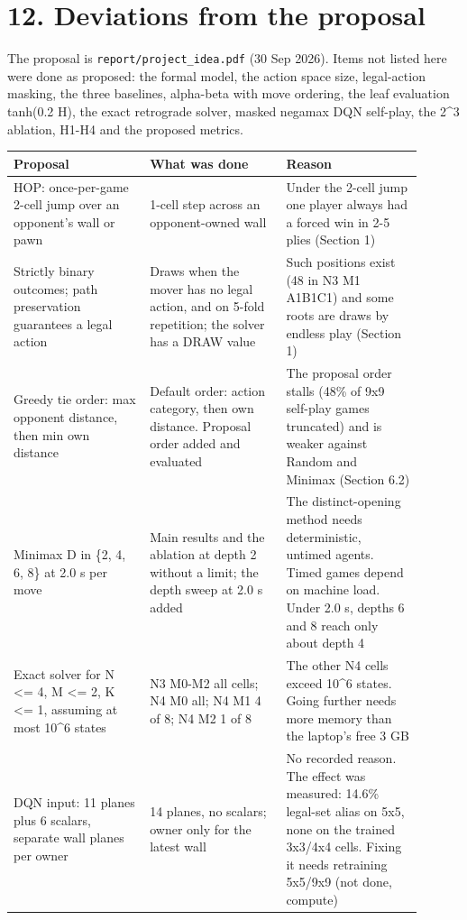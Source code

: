 \documentclass[11pt]{article}
\begin{document}
\section{12. Deviations from the proposal}

The proposal is \texttt{report/project\_idea.pdf} (30 Sep 2026). Items not listed here were done as
proposed: the formal model, the action space size, legal-action masking, the three baselines,
alpha-beta with move ordering, the leaf evaluation tanh(0.2 H), the exact retrograde solver,
masked negamax DQN self-play, the 2\textasciicircum{}3 ablation, H1-H4 and the proposed metrics.

\begin{center}\scriptsize
\begin{longtable}{p{0.30\linewidth}p{0.30\linewidth}p{0.30\linewidth}}
\toprule
Proposal & What was done & Reason \\
\midrule
HOP: once-per-game 2-cell jump over an opponent's wall or pawn & 1-cell step across an opponent-owned wall & Under the 2-cell jump one player always had a forced win in 2-5 plies (Section 1) \\
Strictly binary outcomes; path preservation guarantees a legal action & Draws when the mover has no legal action, and on 5-fold repetition; the solver has a DRAW value & Such positions exist (48 in N3 M1 A1B1C1) and some roots are draws by endless play (Section 1) \\
Greedy tie order: max opponent distance, then min own distance & Default order: action category, then own distance. Proposal order added and evaluated & The proposal order stalls (48\% of 9x9 self-play games truncated) and is weaker against Random and Minimax (Section 6.2) \\
Minimax D in \{2, 4, 6, 8\} at 2.0 s per move & Main results and the ablation at depth 2 without a limit; the depth sweep at 2.0 s added & The distinct-opening method needs deterministic, untimed agents. Timed games depend on machine load. Under 2.0 s, depths 6 and 8 reach only about depth 4 \\
Exact solver for N <= 4, M <= 2, K <= 1, assuming at most 10\textasciicircum{}6 states & N3 M0-M2 all cells; N4 M0 all; N4 M1 4 of 8; N4 M2 1 of 8 & The other N4 cells exceed 10\textasciicircum{}6 states. Going further needs more memory than the laptop's free 3 GB \\
DQN input: 11 planes plus 6 scalars, separate wall planes per owner & 14 planes, no scalars; owner only for the latest wall & No recorded reason. The effect was measured: 14.6\% legal-set alias on 5x5, none on the trained 3x3/4x4 cells. Fixing it needs retraining 5x5/9x9 (not done, compute) \\

\end{longtable}
\end{center}
\end{document}
